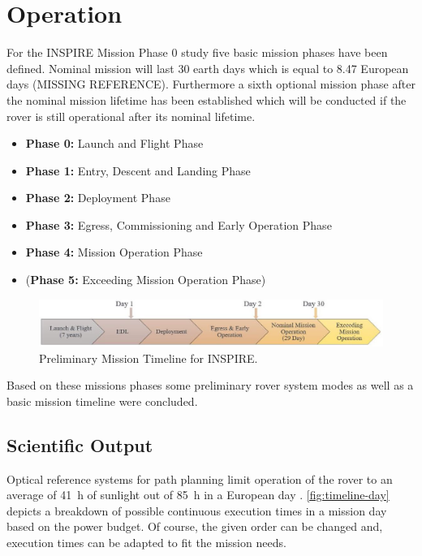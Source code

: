 \chapter{Operation}
\label{chap:Operation}

For the INSPIRE Mission Phase 0 study five basic mission phases have been defined. Nominal mission will last 30 earth days which is equal to 8.47 European days (MISSING REFERENCE). Furthermore a sixth optional mission phase after the nominal mission lifetime has been established which will be conducted if the rover is still operational after its nominal lifetime.

\begin{itemize}
\itemsep0pt
\item	\textbf{Phase 0:} Launch and Flight Phase
\item	\textbf{Phase 1:} Entry, Descent and Landing Phase
\item	\textbf{Phase 2:} Deployment Phase
\item	\textbf{Phase 3:} Egress, Commissioning and Early Operation Phase
\item	\textbf{Phase 4:} Mission Operation Phase
\item	(\textbf{Phase 5:} Exceeding Mission Operation Phase) 
\end{itemize}

\begin{figure}[H]
{\centering
\includegraphics[width=1\textwidth]{Media/timeline}
\caption{Preliminary Mission Timeline for INSPIRE.}
\label{fig:timeline}
}
\end{figure}

Based on these missions phases some preliminary rover system modes as well as a basic mission timeline were concluded.

\section{Scientific Output}
\label{chap:sc-output}

Optical reference systems for path planning limit operation of the rover to an average of 41~h of sunlight out of 85~h in a European day \cite{Europa}. \autoref{fig:timeline-day} depicts a breakdown of possible continuous execution times in a mission day based on the power budget. Of course, the given order can be changed and, execution times can be adapted to fit the mission needs. \\

